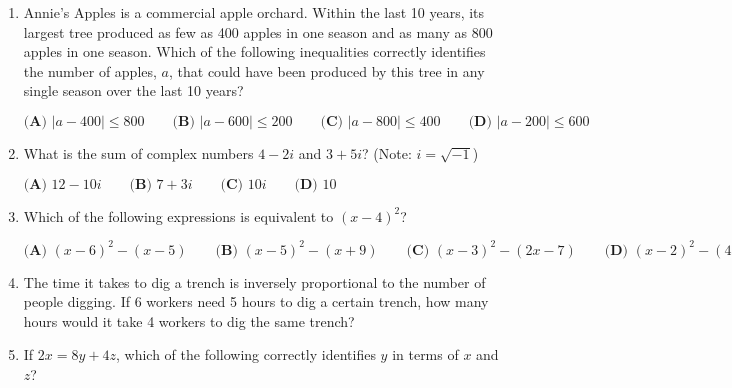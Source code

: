\documentclass[../satmath.tex]{subfiles}
\begin{document}
\begin{enumerate}[label=\bfseries\arabic*.]
\item Annie's Apples is a commercial apple orchard. Within the last 10 years, its largest tree produced as few as 400 apples in one season and as many as 
800 apples in one season. Which of the following inequalities correctly identifies the number of apples, $a$, that could have been produced 
by this tree in any single season over the last 10 years?

$\textbf{(A) } |a-400|\leq 800 \qquad \textbf{(B) } |a-600|\leq 200 \qquad \textbf{(C) } |a-800|\leq 400 \qquad \textbf{(D) } |a-200|\leq 600$
 
\item What is the sum of complex numbers $4-2i$ and $3+5i$? (Note: $i=\sqrt{-1}$)

$\textbf{(A) } 12-10i \qquad \textbf{(B) } 7+3i \qquad \textbf{(C) } 10i \qquad \textbf{(D) } 10$

\item Which of the following expressions is equivalent to $(x-4)^2$?

$\textbf{(A) } (x-6)^2-(x-5) \qquad \textbf{(B) } (x-5)^2-(x+9) \qquad \textbf{(C) } (x-3)^2-(2x-7) \qquad \textbf{(D) } (x-2)^2-(4x-8)$

\item The time it takes to dig a trench is inversely proportional to the number of people digging. If 6 workers need 5 hours to dig a certain trench, 
how many hours would it take 4 workers to dig the same trench?
 
\item If $2x=8y+4z$, which of the following correctly identifies $y$ in terms of $x$ and $z$?


\end{enumerate}
\end{document}
